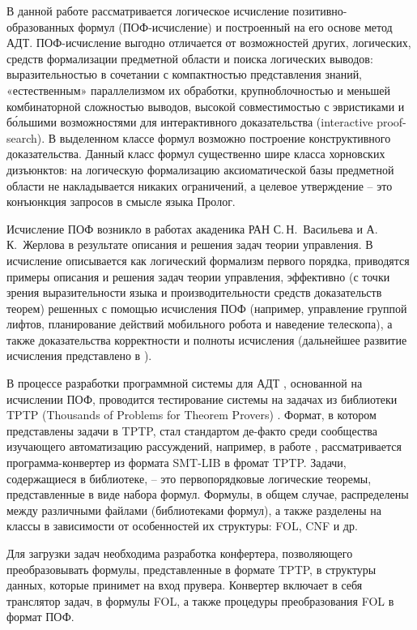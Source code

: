 \documentclass[a4paper]{jctart15b}
\begin{document}
В данной работе рассматривается логическое исчисление позитивно-образованных формул (ПОФ-исчисление) и построенный на его основе метод АДТ. ПОФ-исчисление выгодно отличается от возможностей других, логических, средств формализации предметной области и поиска логических выводов: выразительностью в сочетании с компактностью представления знаний, «естественным» параллелизмом их обработки, крупноблочностью и меньшей комбинаторной сложностью выводов, высокой совместимостью с эвристиками и б\'ольшими возможностями для интерактивного доказательства (interactive proof-search). В выделенном классе формул возможно построение конструктивного доказательства. Данный класс формул существенно шире класса хорновских дизъюнктов: на логическую формализацию аксиоматической базы предметной области не накладывается никаких ограничений, а целевое утверждение -- это конъюнкция запросов в смысле языка Пролог.

Исчисление ПОФ возникло в работах акаденика РАН С.\,Н.~Васильева и
А.\,К.~Жерлова \cite{SNV1990,ICDS2000} в результате описания и решения задач
теории управления. В \cite{ICDS2000} исчисление описывается как логический
формализм первого порядка, приводятся примеры описания и решения задач теории
управления, эффективно (с точки зрения выразительности языка и
производительности средств доказательств теорем) решенных с помощью исчисления ПОФ (например, управление группой лифтов, планирование действий мобильного робота и наведение телескопа), а также доказательства корректности и полноты исчисления (дальнейшее развитие исчисления представлено в \cite{jour2}).

В процессе разработки программной системы для АДТ \cite{mipro2013}, основанной на
исчислении ПОФ, проводится тестирование системы на задачах из библиотеки TPTP
(Thousands of Problems for Theorem Provers) \cite{tptp}. Формат, в котором
представлены задачи в TPTP, стал стандартом де-факто среди сообщества изучающего
автоматизацию рассуждений, например, в работе \cite{SMTtoTPTP}, рассматривается
программа-конвертер из формата SMT-LIB в фромат TPTP. Задачи, содержащиеся в
библиотеке, -- это первопорядковые логические теоремы, представленные в виде
набора формул. Формулы, в общем случае, распределены между различными файлами
(библиотеками формул), а также разделены на классы в зависимости от особенностей
их структуры:  FOL, CNF и др.

Для загрузки задач необходима разработка конфертера, позволяющего преобразовывать
формулы, представленные в формате TPTP, в структуры данных, которые принимет на
вход прувера.  Конвертер включает в себя транслятор задач, в формулы FOL, а
также процедуры преобразования FOL в формат ПОФ.
\end{document}

